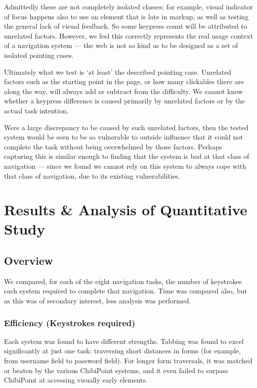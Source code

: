 \documentclass[11pt,openright,a4paper]{report}
\begin{document}
Admittedly these are not completely isolated classes; for example, visual indicator of focus happens also to use an element that is late in markup, as well as testing the general lack of visual feedback. So some keypress count will be attributed to unrelated factors. However, we feel this correctly represents the real usage context of a navigation system --- the web is not so kind as to be designed as a set of isolated pointing cases.

Ultimately what we test is `at least' the described pointing case. Unrelated factors such as the starting point in the page, or how many clickables there are along the way, will always add or subtract from the difficulty. We cannot know whether a keypress difference is caused primarily by unrelated factors or by the actual task intention.

Were a large discrepancy to be caused by such unrelated factors, then the tested system would be seen to be so vulnerable to outside influence that it could not complete the task without being overwhelmed by those factors. Perhaps capturing this is similar enough to finding that the system is bad at that class of navigation --- since we found we cannot rely on this system to always cope with that class of navigation, due to its existing vulnerabilities.

\chapter{Results \& Analysis of Quantitative Study}
\label{chap:results}
\section{Overview}
We compared, for each of the eight navigation tasks, the number of keystrokes each system required to complete that navigation. Time was compared also, but as this was of secondary interest, less analysis was performed.
\subsection{Efficiency (Keystrokes required)}
Each system was found to have different strengths. Tabbing was found to excel significantly at just one task: traversing short distances in forms (for example, from username field to password field). For longer form traversals, it was matched or beaten by the various ChibiPoint systems, and it even failed to surpass ChibiPoint at accessing visually early elements.
\end{document}
